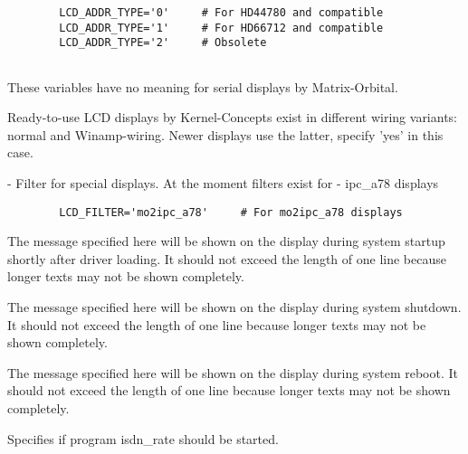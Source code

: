 \begin{description}
\begin{example}
\begin{verbatim}
        LCD_ADDR_TYPE='0'     # For HD44780 and compatible
        LCD_ADDR_TYPE='1'     # For HD66712 and compatible
        LCD_ADDR_TYPE='2'     # Obsolete
        
\end{verbatim}
\end{example}
    
    These variables have no meaning for serial displays by Matrix-Orbital.


Ready-to-use LCD displays by Kernel-Concepts exist in different wiring 
variants: normal and Winamp-wiring. Newer displays use the latter, specify
'yes' in this case.


 - Filter for special displays.
At the moment filters exist for
- ipc\_a78 displays

\begin{example}
\begin{verbatim}
        LCD_FILTER='mo2ipc_a78'     # For mo2ipc_a78 displays
\end{verbatim}
\end{example}


       The message specified here will be shown on the display during system startup 
       shortly after driver loading. It should not exceed the length of one line 
       because longer texts may not be shown completely.


       The message specified here will be shown on the display during system shutdown. 
       It should not exceed the length of one line because longer texts may not be 
       shown completely.


       The message specified here will be shown on the display during system reboot. 
       It should not exceed the length of one line because longer texts may not be 
       shown completely.
       

      Specifies if program isdn\_rate should be started.


\end{description}
